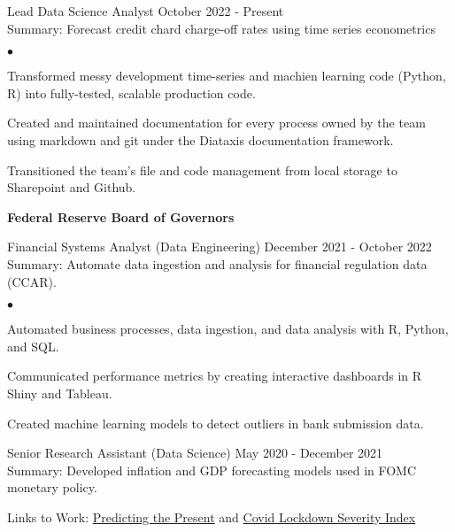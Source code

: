 \documentclass[margin, line]{res}
\newenvironment{list2}{
  \begin{list}{$\bullet$}{%
      \setlength{\itemsep}{0.04in}
      \setlength{\parsep}{0in} \setlength{\parskip}{0in}
      \setlength{\topsep}{0.05in} \setlength{\partopsep}{0in} 
      \setlength{\leftmargin}{\dimexpr 26pt-0.05in}}}
    {\end{list}}
\begin{document}
\begin{resume}
\vspace{-.65cm}
Lead Data Science Analyst \hfill October 2022 - Present\\
\hspace*{3mm} 
    Summary: Forecast credit chard charge-off rates using time series econometrics
\hspace*{3mm}
    \begin{list2}
        \item Transformed messy development time-series and machien learning code (Python, R) into fully-tested, scalable production code.
        \item Created and maintained documentation for every process owned by the team using markdown and git under the Diataxis documentation framework.
        \item Transitioned the team's file and code management from local storage to Sharepoint and Github.
    \end{list2}

{\bf Federal Reserve Board of Governors}\\

\vspace{-.65cm}

Financial Systems Analyst (Data Engineering) \hfill December 2021 - October 2022\\
\hspace*{3mm} 
    Summary: Automate data ingestion and analysis for financial regulation data (CCAR).
\hspace*{3mm}
    \begin{list2}
        \item Automated business processes, data ingestion, and data analysis with R, Python, and SQL.
        \item Communicated performance metrics by creating interactive dashboards in R Shiny and Tableau.
        \item Created machine learning models to detect outliers in bank submission data.
    \end{list2}


Senior Research Assistant (Data Science) \hfill May 2020 - December 2021 \\
\hspace*{3mm}
    Summary: Developed inflation and GDP forecasting models used in FOMC monetary policy.
\vspace{-3mm}

\hspace*{3mm}
    Links to Work:  \href{https://michaelboerman.medium.com/predicting-the-present-a56ff704af0b}{Predicting the Present} and   \href{https://github.com/michaelboerman/lockdown_severity_index#readme}{Covid Lockdown Severity Index}
    

\end{resume}
\end{document}
